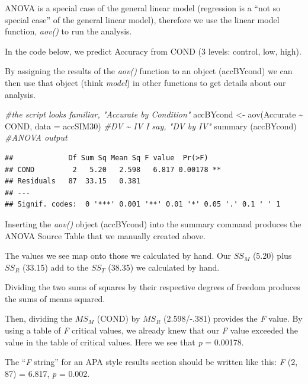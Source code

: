 \documentclass[
  english,
]{book}
\newenvironment{Shaded}{\begin{snugshade}}{\end{snugshade}}
\newcommand{\AttributeTok}[1]{\textcolor[rgb]{0.77,0.63,0.00}{#1}}
\newcommand{\CommentTok}[1]{\textcolor[rgb]{0.56,0.35,0.01}{\textit{#1}}}
\newcommand{\FunctionTok}[1]{\textcolor[rgb]{0.00,0.00,0.00}{#1}}
\newcommand{\NormalTok}[1]{#1}
\newcommand{\OtherTok}[1]{\textcolor[rgb]{0.56,0.35,0.01}{#1}}
\newcommand{\SpecialCharTok}[1]{\textcolor[rgb]{0.00,0.00,0.00}{#1}}
\begin{document}
ANOVA is a special case of the general linear model (regression is a ``not so special case'' of the general linear model), therefore we use the linear model function, \emph{aov()} to run the analysis.

In the code below, we predict Accuracy from COND (3 levels: control, low, high).

By assigning the results of the \emph{aov()} function to an object (accBYcond) we can then use that object (think \emph{model}) in other functions to get details about our analysis.

\begin{Shaded}
\begin{Highlighting}[]
\CommentTok{\#the script looks familiar, "Accurate by Condition"}
\NormalTok{accBYcond }\OtherTok{\textless{}{-}} \FunctionTok{aov}\NormalTok{(Accurate }\SpecialCharTok{\textasciitilde{}}\NormalTok{ COND, }\AttributeTok{data =}\NormalTok{ accSIM30) }\CommentTok{\#DV \textasciitilde{} IV  I say, "DV by IV"}
\FunctionTok{summary}\NormalTok{ (accBYcond) }\CommentTok{\#ANOVA output}
\end{Highlighting}
\end{Shaded}

\begin{verbatim}
##             Df Sum Sq Mean Sq F value  Pr(>F)   
## COND         2   5.20   2.598   6.817 0.00178 **
## Residuals   87  33.15   0.381                   
## ---
## Signif. codes:  0 '***' 0.001 '**' 0.01 '*' 0.05 '.' 0.1 ' ' 1
\end{verbatim}

Inserting the \emph{aov()} object (accBYcond) into the summary command produces the ANOVA Source Table that we manually created above.

The values we see map onto those we calculated by hand. Our \(SS_M\) (5.20) plus \(SS_R\) (33.15) add to the \(SS_T\) (38.35) we calculated by hand.

Dividing the two sums of squares by their respective degrees of freedom produces the sums of means squared.

Then, dividing the \(MS_M\) (COND) by \(MS_R\) (2.598/-.381) provides the \emph{F} value. By using a table of \emph{F} critical values, we already knew that our \emph{F} value exceeded the value in the table of critical values. Here we see that \emph{p} = 0.00178.

The ``\emph{F} string'' for an APA style results section should be written like this: \emph{F} (2, 87) = 6.817, \emph{p} = 0.002.
\end{document}
